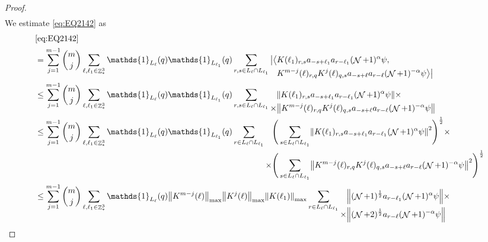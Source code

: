 \documentclass[sn-mathphys, Numbered ,a4paper]{sn-jnl}%
\DeclareMathOperator{\Z}{\mathbb{Z}}
\DeclareMathOperator{\NN}{\mathcal{N}}
\newcommand{\half}{\frac{1}{2}}
\theoremstyle{plain}
\theoremstyle{definition}
\theoremstyle{remark}
\theoremstyle{plain}
\theoremstyle{definition}
\theoremstyle{remark}
\begin{document}
\begin{proof}
\begin{align}
	\end{align}  
	We estimate \eqref{eq:EQ2142} as
	\begin{align}
		&\eqref{eq:EQ2142}\nonumber\\
		&=\sum\limits_{j=1}^{m-1} {{m}\choose j} \sum\limits_{\ell, \ell_1\in \Z^3_*}\mathds{1}_{L_{\ell}}(q) \mathds{1}_{L_{\ell_1}}(q) \sum\limits_{r,s \in L_{\ell} \cap L_{\ell_1}} \begin{aligned}[t] \big|\big<&K(\ell_1)_{r,s}a_{-s+\ell_1} a_{r-\ell_1} (\NN+1)^{\alpha} \psi,\nonumber\\  &K^{m-j}(\ell)_{r,q} K^{j}(\ell)_{q,s} a_{-s+\ell} a_{r-\ell}  (\NN+1)^{-\alpha} \psi\big>\big| \end{aligned} 
		\nonumber\\
		&\leq \sum\limits_{j=1}^{m-1} {{m}\choose j} \sum\limits_{\ell, \ell_1\in \Z^3_*}\mathds{1}_{L_{\ell}}(q) \mathds{1}_{L_{\ell_1}}(q) \sum\limits_{r,s \in L_{\ell} \cap L_{\ell_1}} \begin{aligned}[t] &\norm{ K(\ell_1)_{r,s}a_{-s+\ell_1} a_{r-\ell_1} (\NN+1)^{\alpha}\psi}\nonumber \times \\ \times&\norm{ K^{m-j}(\ell)_{r,q} K^{j}(\ell)_{q,s} a_{-s+\ell}a_{r-\ell} (\NN+1)^{-\alpha} \psi }\end{aligned} \nonumber\\
		&\leq \sum\limits_{j=1}^{m-1} {{m}\choose j} \sum\limits_{\ell, \ell_1\in \Z^3_*} \mathds{1}_{L_{\ell}}(q) \mathds{1}_{L_{\ell_1}}(q) \sum\limits_{r\in L_{\ell} \cap L_{\ell_1}}   \begin{aligned}[t] \Bigg(\sum\limits_{ s \in L_{\ell} \cap L_{\ell_1}}&\norm{ K(\ell_1)_{r,s}a_{-s+\ell_1} a_{r-\ell_1} (\NN+1)^{\alpha}\psi}^2\Bigg)^\half\nonumber \times \\ \times\Bigg(  \sum\limits_{ s \in L_{\ell} \cap L_{\ell_1}}&\norm{ K^{m-j}(\ell)_{r,q} K^{j}(\ell)_{q,s} a_{-s+\ell}a_{r-\ell} (\NN+1)^{-\alpha} \psi }^2\Bigg)^\half\end{aligned} \nonumber\\
		&\leq \sum\limits_{j=1}^{m-1} {{m}\choose j} \sum\limits_{\ell, \ell_1\in \Z^3_*} \mathds{1}_{L_{\ell}}(q) \norm{K^{m-j}(\ell)}_{\mathrm{max}} \norm{K^{j}(\ell)}_{\mathrm{max}} \norm{ K(\ell_1)}_{\mathrm{max}} \sum\limits_{r\in L_{\ell} \cap L_{\ell_1}} \begin{aligned}[t] &\norm{(\NN+1)^\half a_{r-\ell_1} (\NN+1)^{\alpha}\psi}\nonumber \times \\ \times&\norm{   (\NN+2)^\half a_{r-\ell} (\NN+1)^{-\alpha} \psi }\end{aligned} \nonumber

\end{align}
\end{proof}
\end{document}
